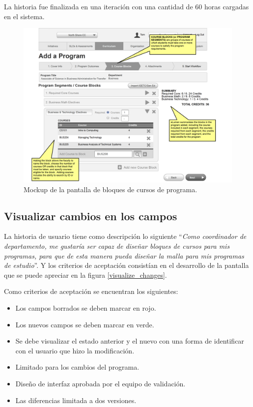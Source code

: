 La historia fue finalizada en una iteración con una cantidad de 60 horas cargadas en el sistema.

\begin{figure}[H]
\centering
\includegraphics[width=125mm,scale=1]{Capitulos/DesarrollodelaAplicacion/Imagenes/program_course_blocks}
\caption{Mockup de la pantalla de bloques de cursos de programa.}
  \label{program_course_blocks}
\end{figure}

\subsection{Visualizar cambios en los campos}
La historia de usuario tiene como descripción lo siguiente \enquote{\textit{Como coordinador de departamento, me gustaría ser capaz de diseñar bloques de cursos para mis programas, para que de esta manera pueda diseñar la malla para mis programas de estudio}}. Y los criterios de aceptación consistían en el desarrollo de la pantalla que se puede apreciar en la figura \ref{visualize_changes}.

Como criterios de aceptación se encuentran los siguientes:
\begin{itemize}
	\item Los campos borrados se deben marcar en rojo.
	\item Los nuevos campos se deben marcar en verde.
	\item Se debe visualizar el estado anterior y el nuevo con una forma de identificar con el usuario que hizo la modificación.
	\item Limitado para los cambios del programa.
	\item Diseño de interfaz aprobada por el equipo de validación.
	\item Las diferencias limitada a dos versiones.
\end{itemize}

